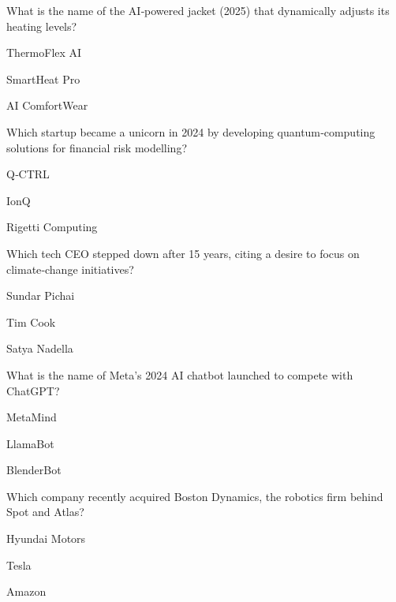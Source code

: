 \begin{enhancedmcq}{What is the name of the AI‑powered jacket (2025) that dynamically adjusts its heating levels?}
\item ThermoFlex AI
\item SmartHeat Pro
\item AI ComfortWear

\end{enhancedmcq}
\begin{enhancedmcq}{Which startup became a unicorn in 2024 by developing quantum‑computing solutions for financial risk modelling?}
\item Q‑CTRL
\item IonQ
\item Rigetti Computing

\end{enhancedmcq}
\begin{enhancedmcq}{Which tech CEO stepped down after 15 years, citing a desire to focus on climate‑change initiatives?}
\item Sundar Pichai
\item Tim Cook
\item Satya Nadella

\end{enhancedmcq}
\begin{enhancedmcq}{What is the name of Meta's 2024 AI chatbot launched to compete with ChatGPT?}
\item MetaMind
\item LlamaBot
\item BlenderBot

\end{enhancedmcq}
\begin{enhancedmcq}{Which company recently acquired Boston Dynamics, the robotics firm behind Spot and Atlas?}
\item Hyundai Motors
\item Tesla
\item Amazon

\end{enhancedmcq}
